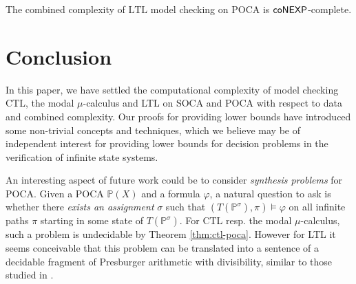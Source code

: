 \documentclass[times,envcountsame]{llncs}
\newcommand{\Poca}{\mathbb{P}}
\newcommand{\ltl}{\text{LTL}}
\begin{document}
\begin{theorem}
  The combined complexity of $\ltl$ model checking on POCA is
  ${\mathsf{coNEXP}}$-complete.
\end{theorem}

\section{Conclusion}
In this paper, we have settled the computational complexity of model
checking CTL, the modal $\mu$-calculus and LTL on SOCA and POCA with
respect to data and combined complexity. Our proofs for providing
lower bounds have introduced some non-trivial concepts and techniques,
which we believe may be of independent interest for providing lower
bounds for decision problems in the verification of infinite state
systems.

An interesting aspect of future work could be to consider
\emph{synthesis problems} for POCA. Given a POCA $\Poca(X)$ and a
formula $\varphi$, a natural question to ask is whether there
\emph{exists an assignment} $\sigma$ such that $(T(\Poca^\sigma), \pi)
\models \varphi$ on all infinite paths $\pi$ starting in some state of
$T(\Poca^\sigma)$. For CTL resp. the modal $\mu$-calculus, such
a problem is undecidable by Theorem \ref{thm:ctl-poca}. However for
LTL it seems conceivable that this problem can be translated into a
sentence of a decidable fragment of Presburger arithmetic with
divisibility, similar to those studied in \cite{BozgaI05}.

\footnotesize

%
%
\end{document}
